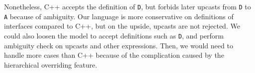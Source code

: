 Nonetheless,
 C++ accepts the definition of \lstinline|D|, but forbids later upcasts from \lstinline|D| to \lstinline|A| because of ambiguity. Our language is more conservative on definitions of interfaces compared to C++, but on the upside, upcasts are not rejected. We could also loosen the model to accept definitions such as \lstinline|D|, and perform ambiguity check on upcasts and other expressions. Then, we would need to handle more cases than C++ because of the complication caused by the hierarchical overriding feature. 

